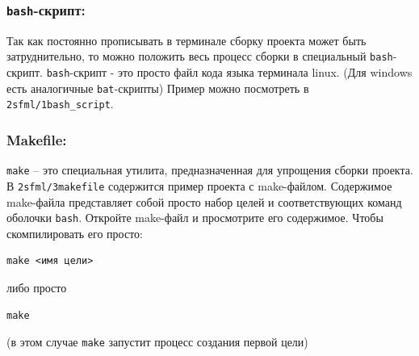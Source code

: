 \documentclass{article}
\begin{document}
\subsubsection*{\texttt{bash}-скрипт:} Так как постоянно прописывать в терминале сборку проекта может быть затруднительно, то можно положить весь процесс сборки в специальный \texttt{bash}-скрипт. \texttt{bash}-скрипт - это просто файл кода языка терминала linux. (Для windows есть аналогичные \texttt{bat}-скрипты) Пример можно посмотреть в \texttt{2sfml/1bash\_script}.

\subsubsection*{Makefile:} \texttt{make} -- это специальная утилита, предназначенная для упрощения сборки проекта. В \texttt{2sfml/3makefile} содержится пример проекта с make-файлом. Содержимое make-файла представляет собой просто набор целей и соответствующих команд оболочки \texttt{bash}. Откройте make-файл и просмотрите его содержимое. Чтобы скомпилировать его просто:
\begin{verbatim}
make <имя цели>
\end{verbatim}
либо просто
\begin{verbatim}
make
\end{verbatim}
(в этом случае \texttt{make} запустит процесс создания первой цели)
\end{document}
